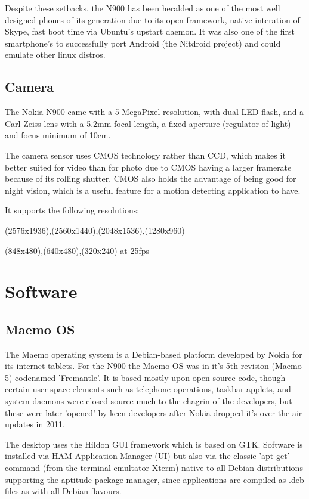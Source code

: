 Despite these setbacks, the N900 has been heralded as one of the most well designed phones of its generation due to its open framework, native interation of Skype, fast boot time via Ubuntu's upstart daemon. It was also one of the first smartphone's to successfully port Android (the Nitdroid project) and could emulate other linux distros.

\subsection{Camera}
The Nokia N900 came with a 5 MegaPixel resolution, with dual LED flash, and a Carl Zeiss lens with a 5.2mm focal length, a fixed aperture (regulator of light) and focus minimum of 10cm.

The camera sensor uses CMOS technology rather than CCD, which makes it better suited for video than for photo due to CMOS having a larger framerate because of its rolling shutter. CMOS also holds the advantage of being good for night vision, which is a useful feature for a motion detecting application to have.

 It supports the following resolutions:
\begin{description}
\vspace{-5pt}
\item [Image:] (2576x1936),(2560x1440),(2048x1536),(1280x960)
\vspace{-5pt}
\item [Video:] (848x480),(640x480),(320x240) at 25fps
\end{description}

\section{Software}
\subsection{Maemo OS}
The Maemo operating system is a Debian-based platform developed by Nokia for its internet tablets. For the N900 the Maemo OS was in it's 5th revision (Maemo 5) codenamed 'Fremantle'. It is based mostly upon open-source code, though certain user-space elements such as telephone operations, taskbar applets, and system daemons were closed source much to the chagrin of the developers, but these were later 'opened' by keen developers after Nokia dropped it's over-the-air updates in 2011.

The desktop uses the Hildon GUI framework which is based on GTK. Software is installed via HAM Application Manager (UI) but also via the classic 'apt-get' command (from the terminal emultator Xterm) native to all Debian distributions supporting the aptitude package manager, since applications are compiled as .deb files as with all Debian flavours.

